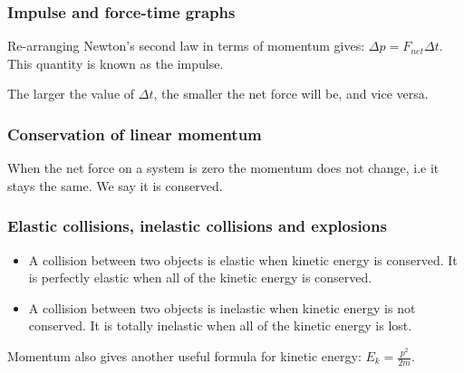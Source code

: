 \subsubsection{Impulse and force-time graphs}
Re-arranging Newton's second law in terms of momentum gives:
$\Delta p = F_{net} \Delta t$. This quantity is known as the impulse.

The larger the value of $\Delta t$, the smaller the net force will be, and vice
versa.

\subsubsection{Conservation of linear momentum}
When the net force on a system is zero the momentum does not change, i.e it
stays the same. We say it is conserved.

\subsubsection{Elastic collisions, inelastic collisions and explosions}
\begin{itemize}
    \item A collision between two objects is elastic when kinetic energy is
        conserved. It is perfectly elastic when all of the kinetic energy is
        conserved.
    \item A collision between two objects is inelastic when kinetic energy is
        not conserved. It is totally inelastic when all of the kinetic energy
        is lost.
\end{itemize}

Momentum also gives another useful formula for kinetic energy:
$E_k = \frac{p^2}{2m}$.

